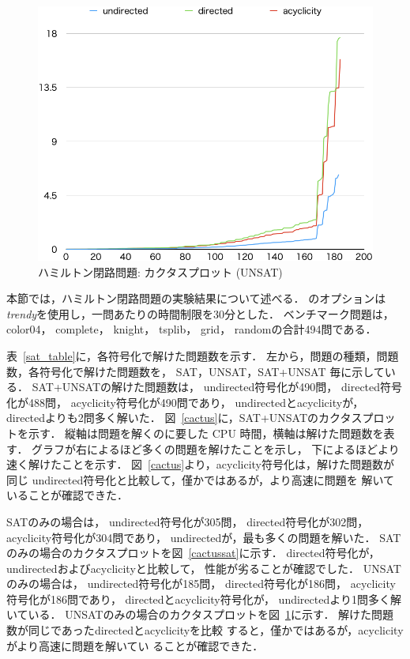 \begin{figure}[tb]
\begin{center}
\includegraphics[width=0.6\linewidth]{fig/cactusunsat.png}
\caption{ハミルトン閉路問題: カクタスプロット (\textsf{UNSAT})}
\label{cactusunsat}
\end{center}
\end{figure}

本節では，ハミルトン閉路問題の実験結果について述べる．
{\clingo}のオプションは\textit{trendy}を使用し，一問あたりの時間制限を30分とした．
ベンチマーク問題は，
\textsf{color04}，
\textsf{complete}，
\textsf{knight}，
\textsf{tsplib}，
\textsf{grid}，
\textsf{random}の合計494問である．

表~\ref{sat_table}に，各符号化で解けた問題数を示す．
左から，問題の種類，問題数，各符号化で解けた問題数を，
\textsf{SAT}，\textsf{UNSAT}，\textsf{SAT+UNSAT}
毎に示している．
%
\textsf{SAT+UNSAT}の解けた問題数は，
\textsf{undirected}符号化が490問，
\textsf{directed}符号化が488問，
\textsf{acyclicity}符号化が490問であり，
\textsf{undirected}と\textsf{acyclicity}が，
\textsf{directed}よりも2問多く解いた．
図~\ref{cactus}に，\textsf{SAT+UNSAT}のカクタスプロットを示す．
縦軸は問題を解くのに要した CPU 時間，横軸は解けた問題数を表す．
グラフが右によるほど多くの問題を解けたことを示し，
下によるほどより速く解けたことを示す．
図~\ref{cactus}より，\textsf{acyclicity}符号化は，解けた問題数が同じ
\textsf{undirected}符号化と比較して，僅かではあるが，より高速に問題を
解いていることが確認できた．

\textsf{SAT}のみの場合は，
\textsf{undirected}符号化が305問，
\textsf{directed}符号化が302問，
\textsf{acyclicity}符号化が304問であり，
\textsf{undirected}が，最も多くの問題を解いた．
\textsf{SAT}のみの場合のカクタスプロットを図~\ref{cactussat}に示す．
\textsf{directed}符号化が，
\textsf{undirected}および\textsf{acyclicity}と比較して，
性能が劣ることが確認でした．
%
\textsf{UNSAT}のみの場合は，
\textsf{undirected}符号化が185問，
\textsf{directed}符号化が186問，
\textsf{acyclicity}符号化が186問であり，
\textsf{directed}と\textsf{acyclicity}符号化が，
\textsf{undirected}より1問多く解いている．
\textsf{UNSAT}のみの場合のカクタスプロットを図~\ref{cactusunsat}に示す．
解けた問題数が同じであった\textsf{directed}と\textsf{acyclicity}を比較
すると，僅かではあるが，\textsf{acyclicity}がより高速に問題を解いてい
ることが確認できた．

